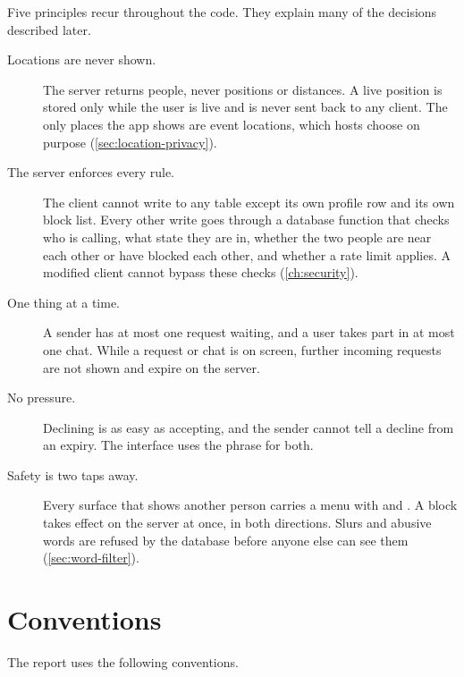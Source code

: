 Five principles recur throughout the code. They explain many of the decisions described later.

\begin{description}
  \item[Locations are never shown.] The server returns people, never positions or distances. A live
    position is stored only while the user is live and is never sent back to any client. The only places
    the app shows are event locations, which hosts choose on purpose (\cref{sec:location-privacy}).
  \item[The server enforces every rule.] The client cannot write to any table except its own profile row
    and its own block list. Every other write goes through a database function that checks who is calling,
    what state they are in, whether the two people are near each other or have blocked each other, and
    whether a rate limit applies. A modified client cannot bypass these checks (\cref{ch:security}).
  \item[One thing at a time.] A sender has at most one request waiting, and a user takes part in at most
    one chat. While a request or chat is on screen, further incoming requests are not shown and expire on
    the server.
  \item[No pressure.] Declining is as easy as accepting, and the sender cannot tell a decline from an
    expiry. The interface uses the phrase  for both.
  \item[Safety is two taps away.] Every surface that shows another person carries a menu with
     and . A block takes effect on the server at once, in both directions. Slurs and
    abusive words are refused by the database before anyone else can see them (\cref{sec:word-filter}).
\end{description}

\section{Conventions}

The report uses the following conventions.

